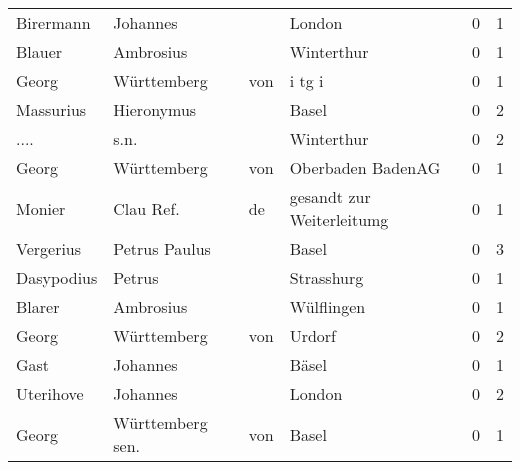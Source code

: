 \begin{tabular}{llllrr}
                Birermann &                           Johannes &             &                                      London &          0 &         1 \\
                   Blauer &                          Ambrosius &             &                                  Winterthur &          0 &         1 \\
                    Georg &                        Württemberg &         von &                                      i tg i &          0 &         1 \\
                Massurius &                         Hieronymus &             &                                       Basel &          0 &         2 \\
                     .... &                               s.n. &             &                                  Winterthur &          0 &         2 \\
                    Georg &                        Württemberg &         von &                           Oberbaden BadenAG &          0 &         1 \\
                   Monier &                          Clau Ref. &          de &                   gesandt zur Weiterleitumg &          0 &         1 \\
                Vergerius &                      Petrus Paulus &             &                                       Basel &          0 &         3 \\
               Dasypodius &                             Petrus &             &                                  Strasshurg &          0 &         1 \\
                   Blarer &                          Ambrosius &             &                                  Wülflingen &          0 &         1 \\
                    Georg &                        Württemberg &         von &                                      Urdorf &          0 &         2 \\
                     Gast &                           Johannes &             &                                       Bäsel &          0 &         1 \\
                Uterihove &                           Johannes &             &                                      London &          0 &         2 \\
                    Georg &                   Württemberg sen. &         von &                                       Basel &          0 &         1 \\

\end{tabular}
